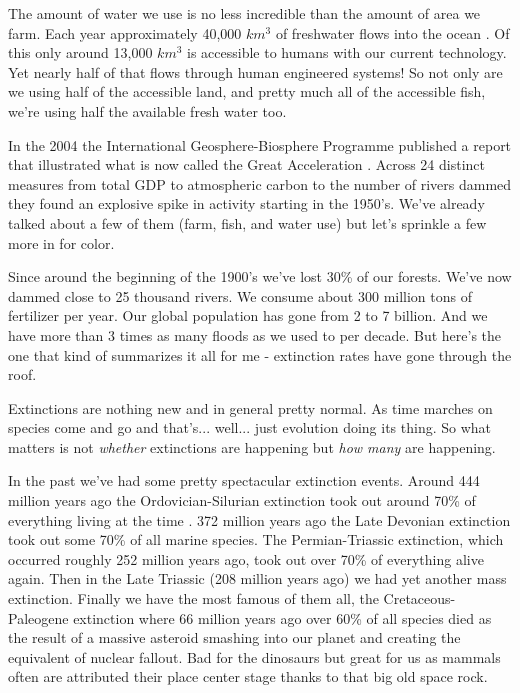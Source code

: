 \documentclass[11pt,a5paper]{book}
\begin{document}
The amount of water we use is no less incredible than the amount of area we farm. Each year approximately 40,000 $km^3$ of freshwater flows into the ocean \cite{eellis}. Of this only around 13,000 $km^3$ is accessible to humans with our current technology. Yet nearly half of that flows through human engineered systems! So not only are we using half of the accessible land, and pretty much all of the accessible fish, we're using half the available fresh water too. 

In the 2004 the International Geosphere-Biosphere Programme published a report that illustrated what is now called the Great Acceleration \cite{wsteffen}. Across 24 distinct measures from total GDP to atmospheric carbon to the number of rivers dammed they found an explosive spike in activity starting in the 1950's. We've already talked about a few of them (farm, fish, and water use) but let's sprinkle a few more in for color. 

Since around the beginning of the 1900's we've lost 30\% of our forests. We've now dammed close to 25 thousand rivers. We consume about 300 million tons of fertilizer per year. Our global population has gone from 2 to 7 billion. And we have more than 3 times as many floods as we used to per decade. But here's the one that kind of summarizes it all for me - extinction rates have gone through the roof.  
\newline

Extinctions are nothing new and in general pretty normal. As time marches on species come and go and that's... well... just evolution doing its thing. So what matters is not \textit{whether} extinctions are happening but \textit{how many} are happening. 

In the past we've had some pretty spectacular extinction events. Around 444 million years ago the Ordovician-Silurian extinction took out around 70\% of everything living at the time \cite{adubey}. 372 million years ago the Late Devonian extinction took out some 70\% of all marine species. The Permian-Triassic extinction, which occurred roughly 252 million years ago, took out over 70\% of everything alive again. Then in the Late Triassic (208 million years ago) we had yet another mass extinction. Finally we have the most famous of them all, the Cretaceous-Paleogene extinction where 66 million years ago over 60\% of all species died as the result of a massive asteroid smashing into our planet and creating the equivalent of nuclear fallout. Bad for the dinosaurs but great for us as mammals often are attributed their place center stage thanks to that big old space rock. 
\end{document}
